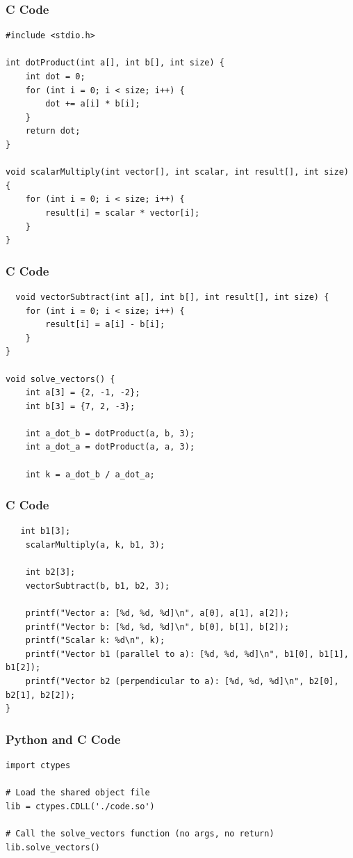 \documentclass{beamer}
\begin{document}
\begin{frame}[fragile]
\frametitle{C Code}
\begin{lstlisting}
#include <stdio.h>

int dotProduct(int a[], int b[], int size) {
    int dot = 0;
    for (int i = 0; i < size; i++) {
        dot += a[i] * b[i];
    }
    return dot;
}

void scalarMultiply(int vector[], int scalar, int result[], int size) {
    for (int i = 0; i < size; i++) {
        result[i] = scalar * vector[i];
    }
}

    \end{lstlisting}

\end{frame}

\begin{frame}[fragile]
\frametitle{C Code}
\begin{lstlisting}
  void vectorSubtract(int a[], int b[], int result[], int size) {
    for (int i = 0; i < size; i++) {
        result[i] = a[i] - b[i];
    }
}

void solve_vectors() {
    int a[3] = {2, -1, -2};
    int b[3] = {7, 2, -3};

    int a_dot_b = dotProduct(a, b, 3);
    int a_dot_a = dotProduct(a, a, 3);

    int k = a_dot_b / a_dot_a;
\end{lstlisting}
\end{frame}
\begin{frame}[fragile]
\frametitle{C Code}
\begin{lstlisting}
   int b1[3];
    scalarMultiply(a, k, b1, 3);

    int b2[3];
    vectorSubtract(b, b1, b2, 3);

    printf("Vector a: [%d, %d, %d]\n", a[0], a[1], a[2]);
    printf("Vector b: [%d, %d, %d]\n", b[0], b[1], b[2]);
    printf("Scalar k: %d\n", k);
    printf("Vector b1 (parallel to a): [%d, %d, %d]\n", b1[0], b1[1], b1[2]);
    printf("Vector b2 (perpendicular to a): [%d, %d, %d]\n", b2[0], b2[1], b2[2]);
}
\end{lstlisting}
\end{frame}


\begin{frame}[fragile]
\frametitle{Python and C Code}

\begin{lstlisting}
import ctypes

# Load the shared object file
lib = ctypes.CDLL('./code.so')

# Call the solve_vectors function (no args, no return)
lib.solve_vectors() 

\end{lstlisting}

\end{frame}

 
\end{document}
